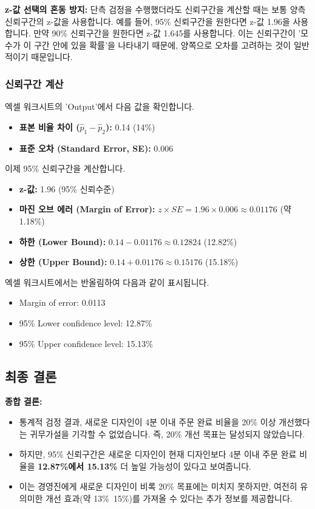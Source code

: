 \documentclass[11pt,a4paper]{article}
\begin{document}
\begin{cautionbox}
\textbf{z-값 선택의 혼동 방지:}
단측 검정을 수행했더라도 신뢰구간을 계산할 때는 보통 양측 신뢰구간의 z-값을 사용합니다. 예를 들어, 95\% 신뢰구간을 원한다면 z-값 1.96을 사용합니다. 만약 90\% 신뢰구간을 원한다면 z-값 1.645를 사용합니다. 이는 신뢰구간이 '모수가 이 구간 안에 있을 확률'을 나타내기 때문에, 양쪽으로 오차를 고려하는 것이 일반적이기 때문입니다.
\end{cautionbox}

\subsubsection{신뢰구간 계산}
엑셀 워크시트의 'Output'에서 다음 값을 확인합니다.
\begin{itemize}
    \item \textbf{표본 비율 차이 ($\hat{p}_1 - \hat{p}_2$):} 0.14 (14\%)
    \item \textbf{표준 오차 (Standard Error, SE):} 0.006
\end{itemize}
이제 95\% 신뢰구간을 계산합니다.
\begin{itemize}
    \item \textbf{z-값:} 1.96 (95\% 신뢰수준)
    \item \textbf{마진 오브 에러 (Margin of Error):} $z \times SE = 1.96 \times 0.006 \approx 0.01176$ (약 1.18\%)
    \item \textbf{하한 (Lower Bound):} $0.14 - 0.01176 \approx 0.12824$ (12.82\%)
    \item \textbf{상한 (Upper Bound):} $0.14 + 0.01176 \approx 0.15176$ (15.18\%)
\end{itemize}
엑셀 워크시트에서는 반올림하여 다음과 같이 표시됩니다.
\begin{itemize}
    \item Margin of error: 0.0113
    \item 95\% Lower confidence level: 12.87\%
    \item 95\% Upper confidence level: 15.13\%
\end{itemize}

\subsection{최종 결론}

\begin{summarybox}
\textbf{종합 결론:}
\begin{itemize}
    \item 통계적 검정 결과, 새로운 디자인이 4분 이내 주문 완료 비율을 20\% 이상 개선했다는 귀무가설을 기각할 수 없었습니다. 즉, 20\% 개선 목표는 달성되지 않았습니다.
    \item 하지만, 95\% 신뢰구간은 새로운 디자인이 현재 디자인보다 4분 이내 주문 완료 비율을 \textbf{12.87\%에서 15.13\%} 더 높일 가능성이 있다고 보여줍니다.
    \item 이는 경영진에게 새로운 디자인이 비록 20\% 목표에는 미치지 못하지만, 여전히 유의미한 개선 효과(약 13\%~15\%)를 가져올 수 있다는 추가 정보를 제공합니다.
\end{itemize}
\end{summarybox}
\end{document}
